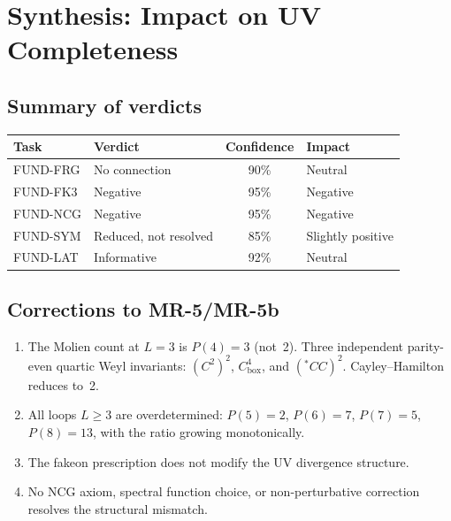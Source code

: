 \documentclass[12pt,a4paper]{article}
\begin{document}
\section{Synthesis: Impact on UV Completeness}
\label{sec:synthesis}

\subsection{Summary of verdicts}

\begin{center}
\begin{tabular}{llcl}
\toprule
Task & Verdict & Confidence & Impact \\
\midrule
FUND-FRG & No connection & 90\% & Neutral \\
FUND-FK3 & \textcolor{long}{Negative} & 95\% & Negative \\
FUND-NCG & \textcolor{long}{Negative} & 95\% & Negative \\
FUND-SYM & Reduced, not resolved & 85\% & Slightly positive \\
FUND-LAT & Informative & 92\% & Neutral \\
\bottomrule
\end{tabular}
\end{center}

\subsection{Corrections to MR-5/MR-5b}

\begin{enumerate}
  \item The Molien count at $L=3$ is $P(4) = 3$ (not~2).
    Three independent parity-even quartic Weyl invariants: $(C^2)^2$,
    $C^4_{\mathrm{box}}$, and $({}^*\!CC)^2$.  Cayley--Hamilton reduces to~2.
  \item All loops $L \geq 3$ are overdetermined: $P(5)=2$, $P(6)=7$,
    $P(7)=5$, $P(8)=13$, with the ratio growing monotonically.
  \item The fakeon prescription does not modify the UV divergence structure.
  \item No NCG axiom, spectral function choice, or non-perturbative correction
    resolves the structural mismatch.
\end{enumerate}
\end{document}
